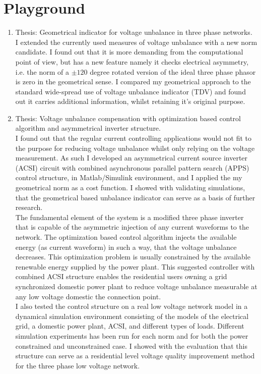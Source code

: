 
\section{Playground}

\begin{enumerate}
\item Thesis: Geometrical indicator for voltage unbalance in three phase networks.\\
    I extended the currently used measures of voltage unbalance with a new norm candidate. I found out that it is more demanding from the computational point of view, but has a new feature namely it checks electrical asymmetry, i.e. the norm of a $\pm120$ degree rotated version of the ideal three phase phasor is zero in the geometrical sense. I compared my geometrical approach to the standard wide-spread use of voltage unbalance indicator (TDV) and found out it carries additional information, whilst retaining it's original purpose. 
				
\item Thesis: Voltage unbalance compensation with optimization based control algorithm and asymmetrical inverter structure.\\
     I found out that the regular current controlling applications would not fit to the purpose for reducing voltage unbalance whilst only relying on the voltage measurement. As such I developed an asymmetrical current source inverter (ACSI) circuit with combined asynchronous parallel pattern search (APPS) control structure, in Matlab/Simulink environment, and I applied the my geometrical norm as a cost function. I showed with validating simulations, that the geometrical based unbalance indicator can serve as a basis of further research. \\
		The fundamental element of the system is a modified three phase inverter that is capable of the asymmetric injection of any current waveforms to the network. The optimization based control algorithm injects the available energy (as current waveform) in such a way, that the voltage unbalance decreases. This optimization problem is usually constrained by the available renewable energy supplied by the power plant. This suggested controller with combined ACSI structure enables the residential users owning a grid synchronized domestic power plant to reduce voltage unbalance measurable at any low voltage domestic the connection point.\\
    I also tested the control structure on a real low voltage network model in a dynamical simulation environment consisting of the models of the electrical grid, a domestic power plant, ACSI, and different types of loads. Different simulation experiments has been run for each norm and for both the power constrained and unconstrained case. I showed with the evaluation that this structure can serve as a residential level voltage quality improvement method for the three phase low voltage network.
		

\end{enumerate}
